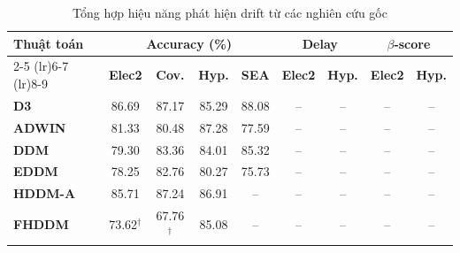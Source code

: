 \begin{table}[!htbp]
	\centering
	\caption{Tổng hợp hiệu năng phát hiện drift từ các nghiên cứu gốc}
	\label{tab:accuracy_results}
	\begin{threeparttable}
		\small
		\begin{tabular}{@{}lcccccccc@{}}
			\toprule
			\multirow{2}{*}{\textbf{Thuật toán}} & \multicolumn{4}{c}{\textbf{Accuracy (\%)}} & \multicolumn{2}{c}{\textbf{Delay}} & \multicolumn{2}{c}{\textbf{$\beta$-score}}                                                                                  \\
			\cmidrule(lr){2-5} \cmidrule(lr){6-7} \cmidrule(lr){8-9}
			                                     & \textbf{Elec2}                             & \textbf{Cov.}                      & \textbf{Hyp.}                              & \textbf{SEA} & \textbf{Elec2} & \textbf{Hyp.} & \textbf{Elec2} & \textbf{Hyp.} \\
			\midrule
			\textbf{D3}                          & 86.69                                      & 87.17                              & 85.29                                      & 88.08        & --             & --            & --             & --            \\
			\textbf{ADWIN}                       & 81.33                                      & 80.48                              & 87.28                                      & 77.59        & --             & --            & --             & --            \\
			\textbf{DDM}                         & 79.30                                      & 83.36                              & 84.01                                      & 85.32        & --             & --            & --             & --            \\
			\textbf{EDDM}                        & 78.25                                      & 82.76                              & 80.27                                      & 75.73        & --             & --            & --             & --            \\
			\textbf{HDDM-A}                      & 85.71                                      & 87.24                              & 86.91                                      & --           & --             & --            & --             & --            \\
			\textbf{FHDDM}                       & 73.62$^{\dagger}$                          & 67.76$^{\dagger}$                  & 85.08                                      & --           & --             & --            & --             & --            \\

\end{tabular}
\end{threeparttable}
\end{table}
